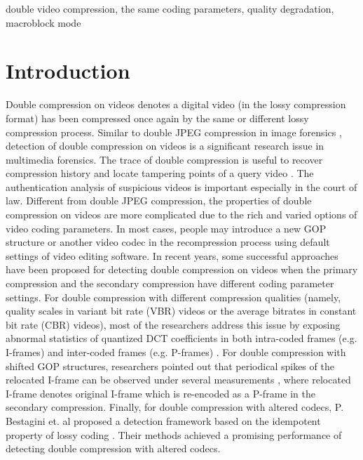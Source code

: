 \documentclass[journal,sort]{IEEEtran}
\begin{document}
\begin{IEEEkeywords}
		double video compression, the same coding parameters, quality degradation, macroblock mode
\end{IEEEkeywords}


\section{Introduction\label{intro}}

Double compression on videos denotes a digital video (in the lossy compression format) has been compressed once again by the same or different lossy compression process. Similar to double JPEG compression in image forensics \cite{barni2016adversary,li2015revealing,li2015statistical}, detection of double compression on videos is a significant research issue in multimedia forensics. The trace of double compression is useful to recover compression history and locate tampering points of a query video \cite{chen2016automatic,aghamaleki2016inter}. The authentication analysis of suspicious videos is important especially in the court of law. Different from double JPEG compression, the properties of double compression on videos are more complicated due to the rich and varied options of video coding parameters. In most cases, people may introduce a new GOP structure or another video codec in the recompression process using default settings of video editing software. In recent years, some successful approaches have been proposed for detecting double compression on videos when the primary compression and the secondary compression have different coding parameter settings. For double compression with different compression qualities (namely, quality scales in variant bit rate (VBR) videos or the average bitrates in constant bit rate (CBR) videos), most of the researchers address this issue by exposing abnormal statistics of quantized DCT coefficients in both intra-coded frames (e.g. I-frames) and inter-coded frames (e.g. P-frames) \cite{chen2009detection,wang2009exposing,su2010detection,liao2011double,sun2012exposing,jiang2013detection}. For double compression with shifted GOP structures, researchers pointed out that periodical spikes of the relocated I-frame can be observed under several measurements \cite{vazquez2012detection,stamm2012temporal,he2015double,he2016double,he2017detection,he2017frame}, where relocated I-frame denotes original I-frame which is re-encoded as a P-frame in the secondary compression. Finally, for double compression with altered codecs, P. Bestagini et. al proposed a detection framework based on the idempotent property of lossy coding \cite{bestagini2012video,bestagini2013video,bestagini2016codec}. Their methods achieved a promising performance of detecting double compression with altered codecs. 
\end{document}
